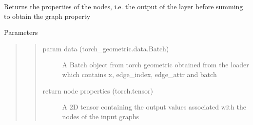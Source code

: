 \documentclass[letterpaper,10pt,english]{sphinxmanual}
\begin{document}
\begin{fulllineitems}
\begin{fulllineitems}
Returns the properties of the nodes, i.e. the output of the layer before summing to obtain the
graph property

Parameters
\begin{quote}
\begin{quote}\begin{description}
\item[{param data (torch\_geometric.data.Batch)}] \leavevmode
A Batch object from torch geometric obtained from the loader
which contains x, edge\_index, edge\_attr and batch

\item[{return node properties (torch.tensor)}] \leavevmode
A 2D tensor containing the output values associated with the
nodes of the input graphs

\end{description}\end{quote}
\end{quote}

\end{fulllineitems}


\end{fulllineitems}

\end{document}
